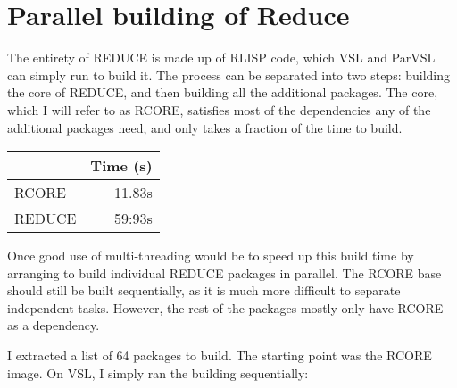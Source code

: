 
\section{Parallel building of Reduce}

The entirety of REDUCE is made up of RLISP code, which VSL and ParVSL
can simply run to build it. The process can be separated into two steps:
building the core of REDUCE, and then building all the additional packages.
The core, which I will refer to as RCORE, satisfies most of the dependencies
any of the additional packages need, and only takes a fraction of the time
to build.

\begin{table}[H]
\centering
\begin{tabular}{lr}
 & Time (s)\\
\hline
RCORE & 11.83s\\
REDUCE & 59:93s\\
\end{tabular}
\end{table}

Once good use of multi-threading would be to speed up this build time by
arranging to build individual REDUCE packages in parallel. The RCORE base
should still be built sequentially, as it is much more difficult to
separate independent tasks. However, the rest of the packages mostly
only have RCORE as a dependency.

I extracted a list of 64 packages to build. The starting point was the
RCORE image. On VSL, I simply ran the building sequentially:


